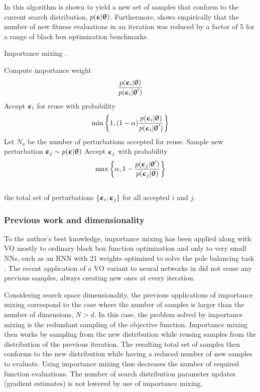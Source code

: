 In \cite{Sun2009} this algorithm is shown to yield a new set of samples that conform to the current search distribution, $p({\boldsymbol{\upepsilon}}|{\boldsymbol{\uptheta}})$. Furthermore, \cite{Yi2009} shows empirically that the number of new fitness evaluations in an iteration was reduced by a factor of 5 for a range of black box optimization benchmarks. 

\begin{algorithm}[tbp!]
    \caption{Importance mixing \cite{Sun2009}. \label{alg: Importance mixing}}
    \begin{algorithmic}[1]
            \State Compute importance weight 
            $$\frac{p({\boldsymbol{\upepsilon}}_i|{\boldsymbol{\uptheta}})}{p({\boldsymbol{\upepsilon}}_i|{\boldsymbol{\uptheta}}')}$$
            \State Accept ${\boldsymbol{\upepsilon}}_i$ for reuse with probability
            $$\min{\left\{1, (1-\alpha)\frac{p({\boldsymbol{\upepsilon}}_i|{\boldsymbol{\uptheta}})}{p({\boldsymbol{\upepsilon}}_i|{\boldsymbol{\uptheta}}')}\right\}}$$
        \EndFor
        \State Let $N_a$ be the number of perturbations accepted for reuse.
            \State Sample new perturbation ${\boldsymbol{\upepsilon}}_j\sim p({\boldsymbol{\upepsilon}}|{\boldsymbol{\uptheta}})$
            \State Accept ${\boldsymbol{\upepsilon}}_j$ with probability
            $$\max{\left\{\alpha, 1 - \frac{p({\boldsymbol{\upepsilon}}_j|{\boldsymbol{\uptheta}}')}{p({\boldsymbol{\upepsilon}}_j|{\boldsymbol{\uptheta}})}\right\}}$$
        \\
        \Return the total set of perturbations $\{{\boldsymbol{\upepsilon}}_i, {\boldsymbol{\upepsilon}}_j\}$ for all accepted $i$ and $j$.
    \end{algorithmic}
\end{algorithm}


\subsubsection{Previous work and dimensionality}
To the author's best knowledge, importance mixing has been applied along with \gls{VO} mostly to ordinary black box function optimization and only to very small \glspl{NN}, such as an \gls{RNN} with 21 weights optimized to solve the pole balancing task \cite{Yi2009}. The recent application of a \gls{VO} variant to neural networks in \cite{Salimans2017} did not reuse any previous samples, always creating new ones at every iteration.

Considering search space dimensionality, the previous applications of importance mixing correspond to the case where the number of samples is larger than the number of dimensions, $N>d$. In this case, the problem solved by importance mixing is the redundant sampling of the objective function. Importance mixing then works by sampling from the new distribution while reusing samples from the distribution of the previous iteration. The resulting total set of samples then conforms to the new distribution while having a reduced number of new samples to evaluate. Using importance mixing thus decreases the number of required function evaluations. The number of search distribution parameter updates (gradient estimates) is not lowered by use of importance mixing.


